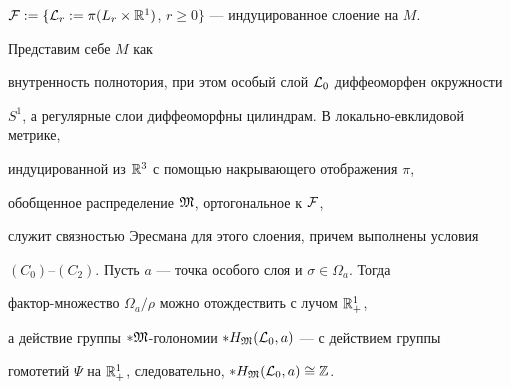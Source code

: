 ${\cal F}:=\{{\cal L}_r:=\pi(L_r\times{\Bbb


R}^1)$, $r\ge 0\}$ --- индуцированное слоение на $M$.


Представим себе $M$ как


внутренность полнотория, при этом особый слой ${\cal L}_0$ диффеоморфен окружности


$S^1$, а регулярные слои диффеоморфны цилиндрам. В локально-евклидовой метрике,


индуцированной из ${\Bbb R}^3$ с помощью накрывающего отображения $\pi$,


обобщенное распределение $\frak M$, ортогональное к $\cal F$,


служит связностью Эресмана для этого слоения, причем выполнены условия


$(C_0)$--$(C_2)$. Пусть $a$ --- точка особого слоя и $\sigma\in\Omega_a$. Тогда


фактор-множество $\Omega_a/\rho$ можно отождествить с лучом ${\Bbb R}_+^1$,


а действие группы $*\frak M$-голономии $*H_{\frak M}({\cal L}_0,a)$ --- с действием группы


гомотетий $\Psi$ на ${\Bbb R}_+^1$, следовательно, $*H_{\frak M}({\cal L}_0,a)\cong\Bbb Z$.








